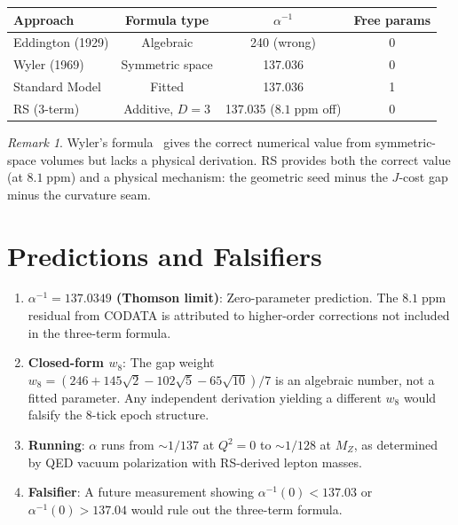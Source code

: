\documentclass[12pt,a4paper]{article}
\theoremstyle{definition}
\theoremstyle{remark}
\newtheorem{remark}[theorem]{Remark}
\begin{document}
\begin{center}
\renewcommand{\arraystretch}{1.3}
\begin{tabular}{@{}lccc@{}}
\toprule
\textbf{Approach} & \textbf{Formula type} &
\textbf{$\alpha^{-1}$} &
\textbf{Free params} \\
\midrule
Eddington (1929) & Algebraic & 240 (wrong) & 0 \\
Wyler (1969) & Symmetric space & 137.036 & 0 \\
Standard Model & Fitted & 137.036 & 1 \\
RS (3-term) & Additive, $D = 3$ & 137.035 ($8.1\;\mathrm{ppm}$ off) & 0 \\
\bottomrule
\end{tabular}
\end{center}

\begin{remark}
Wyler's formula~\cite{Wyler1969} gives the correct numerical
value from symmetric-space volumes but lacks a physical
derivation.  RS provides both the correct value (at
$8.1\;\mathrm{ppm}$) and a physical mechanism: the geometric
seed minus the $J$-cost gap minus the curvature seam.
\end{remark}

\section{Predictions and Falsifiers}
\label{sec:predictions}

\begin{enumerate}
  \item \textbf{$\alpha^{-1} = 137.0349$ (Thomson limit)}:
  Zero-parameter prediction.  The $8.1\;\mathrm{ppm}$ residual
  from CODATA is attributed to higher-order corrections not
  included in the three-term formula.

  \item \textbf{Closed-form $w_8$}: The gap weight
  $w_8 = (246 + 145\sqrt{2} - 102\sqrt{5} - 65\sqrt{10})/7$
  is an algebraic number, not a fitted parameter.  Any independent
  derivation yielding a different $w_8$ would falsify the 8-tick
  epoch structure.

  \item \textbf{Running}: $\alpha$ runs from $\sim 1/137$ at
  $Q^2 = 0$ to $\sim 1/128$ at $M_Z$, as determined by QED
  vacuum polarization with RS-derived lepton masses.

  \item \textbf{Falsifier}: A future measurement showing
  $\alpha^{-1}(0) < 137.03$ or $\alpha^{-1}(0) > 137.04$ would
  rule out the three-term formula.
\end{enumerate}
\end{document}
